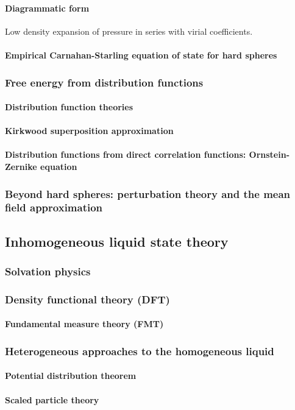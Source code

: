 \paragraph{Diagrammatic form}
Low density expansion of pressure in series with virial coefficients.
\paragraph{Empirical Carnahan-Starling equation of state for hard spheres}

\subsubsection{Free energy from distribution functions}
\paragraph{Distribution function theories}
\paragraph{Kirkwood superposition approximation}
\paragraph{Distribution functions from direct correlation functions: Ornstein-Zernike equation}

\subsubsection{Beyond hard spheres: perturbation theory and the mean field approximation}

\subsection{Inhomogeneous liquid state theory}

\subsubsection{Solvation physics}
\subsubsection{Density functional theory (DFT)}
\paragraph{Fundamental measure theory (FMT)}
\subsubsection{Heterogeneous approaches to the homogeneous liquid}
\paragraph{Potential distribution theorem}
\paragraph{Scaled particle theory}
